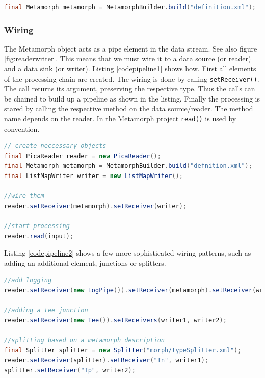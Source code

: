 \documentclass[12pt,a4paper]{article}
\begin{document}
\begin{lstlisting}[float=htb, label=creation, caption=Creating a Metamorph object based on a Metamorph description., language=Java]
final Metamorph metamorph = MetamorphBuilder.build("definition.xml");
\end{lstlisting}

\subsubsection{Wiring}
The Metamorph object acts as a pipe element in the data stream. See also figure \ref{fig:readerwriter}. This means that we must wire it to a data source (or reader) and a data sink (or writer). Listing \ref{codepipeline1} shows how. First all elements of the processing chain are created.
The wiring is done by calling {\tt setReceiver()}. The call returns its argument, preserving the respective type. Thus the calls can be chained to build up a pipeline as shown in the listing. Finally the processing is stared by calling the respective method on the data source/reader. The method name depends on the reader. In the Metamorph project {\tt read()} is used by convention.

\begin{lstlisting}[float=htb, label=codepipeline1,caption= Putting together a processing pipeline according to the pattern in section \ref{pipeline}., language=Java]
// create neccessary objects
final PicaReader reader = new PicaReader();
final Metamorph metamorph = MetamorphBuilder.build("defnition.xml");
final ListMapWriter writer = new ListMapWriter();

//wire them
reader.setReceiver(metamorph).setReceiver(writer);

//start processing
reader.read(input);

\end{lstlisting}

Listing \ref{codepipeline2} shows a few more sophisticated wiring patterns, such as adding an additional element, junctions or splitters.

\begin{lstlisting}[float=htb, label=codepipeline2,caption= Advanced wiring., language=Java]
//add logging
reader.setReceiver(new LogPipe()).setReceiver(metamorph).setReceiver(writer);

//adding a tee junction
reader.setReceiver(new Tee()).setReceivers(writer1, writer2);

//splitting based on a metamorph description
final Splitter splitter = new Splitter("morph/typeSplitter.xml");
reader.setReceiver(splitter).setReceiver("Tn", writer1);
splitter.setReceiver("Tp", writer2);
\end{lstlisting}
\end{document}

